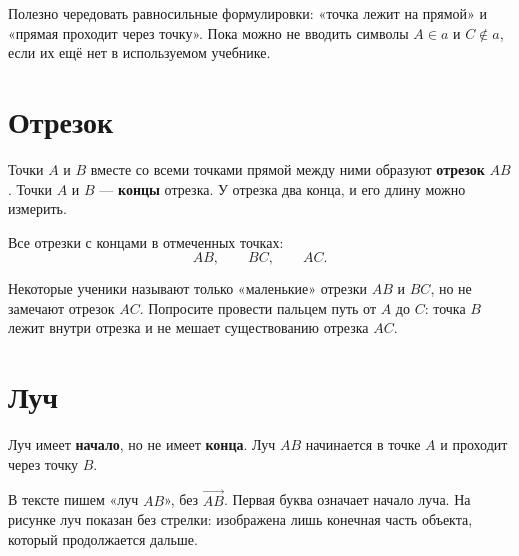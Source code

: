 \begin{teacherbox}
  Полезно чередовать равносильные формулировки: «точка лежит на прямой» и
  «прямая проходит через точку». Пока можно не вводить символы
  \(A\in a\) и \(C\notin a\), если их ещё нет в используемом учебнике.
\end{teacherbox}

\section{Отрезок}

\segmentexamplefigure

\begin{propertybox}[Ответ]
  Точки \(A\) и \(B\) вместе со всеми точками прямой между ними образуют
  \textbf{отрезок} \(AB\). Точки \(A\) и \(B\) — \textbf{концы} отрезка.
  У отрезка два конца, и его длину можно измерить.
\end{propertybox}

\threelinepointsfigure

\begin{practicebox}
  Все отрезки с концами в отмеченных точках:
  \[
    AB,\qquad BC,\qquad AC.
  \]
\end{practicebox}

\begin{teacherbox}
  Некоторые ученики называют только «маленькие» отрезки \(AB\) и \(BC\),
  но не замечают отрезок \(AC\). Попросите провести пальцем путь от \(A\)
  до \(C\): точка \(B\) лежит внутри отрезка и не мешает существованию
  отрезка \(AC\).
\end{teacherbox}

\section{Луч}

\rayexamplefigure

\begin{propertybox}[Ответ]
  Луч имеет \textbf{начало}, но не имеет \textbf{конца}. Луч \(AB\)
  начинается в точке \(A\) и проходит через точку \(B\).
\end{propertybox}

\begin{notebox}[Обозначение]
  В тексте пишем «луч \(AB\)», без \(\overrightarrow{AB}\). Первая буква
  означает начало луча. На рисунке луч показан без стрелки: изображена лишь
  конечная часть объекта, который продолжается дальше.
\end{notebox}

